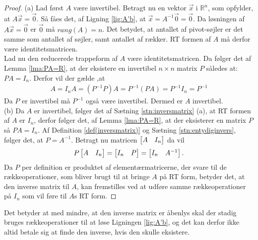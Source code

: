 \begin{proof}
(a) Lad først $A$ være invertibel. 
Betragt nu en vektor $\vec{x}$ i $\mathds{R}^n$, som opfylder, at $A\vec{x}=\vec{0}$.
Så fåes det, af Ligning \eqref{lig:A'b}, at $\vec{x}=A^{-1} \vec{0}=\vec{0}$.
Da løsningen af  $A\vec{x}=\vec{0}$ er $\vec{0}$ må $rang(A)=n$.
Det betydet, at antallet af pivot-søjler er det samme som antallet af søjler, samt antallet af rækker. 
RT formen af $A$ må derfor være identitetsmatricen. 
\\%
Lad nu den reducerede trappeform af $A$ være identitetsmatricen.
Da følger det af Lemma \ref{lma:PA=R}, at der eksistere en invertibel $n \times n$  matrix $P$ således at: $PA=I_n$.
Derfor vil der gælde ,at
\begin{align*}
A=I_nA=(P^{-1}P)A=P^{-1}(PA)=P^{-1}I_n=P^{-1}
\end{align*}
Da $P$ er invertibel må $P^{-1}$ også være invertibel. 
Dermed er $A$ invertibel. 
\\ %
(b) Da $A$ er invertibel, følger det af Sætning \ref{stn:inversmatrix} (a), at RT formen af $A$ er $I_n$, derfor følger det, af Lemma \ref{lma:PA=R}, at der eksisterer en matrix $P$ så $PA = I_n$. 
Af Definition \ref{def(inversmatrix)} og Sætning \ref{stn:entydiginvers}, følger det, at $P = A^{-1}$.
Betragt nu matricen $\begin{bmatrix} A&I_n \end{bmatrix}$ da vil
\begin{align*}
P \begin{bmatrix} A & I_n \end{bmatrix} = \begin{bmatrix} I_n & P \end{bmatrix} = \begin{bmatrix} I_n & A^{-1} \end{bmatrix}.
\end{align*}
Da $P$ per definition er produktet af elementærmatricerne, der svare til de rækkeoperationer, som bliver brugt til at bringe $A$ på RT form, betyder det, at den inverse matrix til $A$, kan fremstilles ved at udføre samme rækkeoperationer på $I_n$ som vil føre til $A$s RT form.
\end{proof}
Det betyder at med mindre, at den inverse matrix er åbenlys skal der stadig bruges rækkeoperationer til at løse Ligningen \eqref{lig:A'b}, og det kan derfor ikke altid betale sig at finde den inverse, hvis den skulle eksistere.






